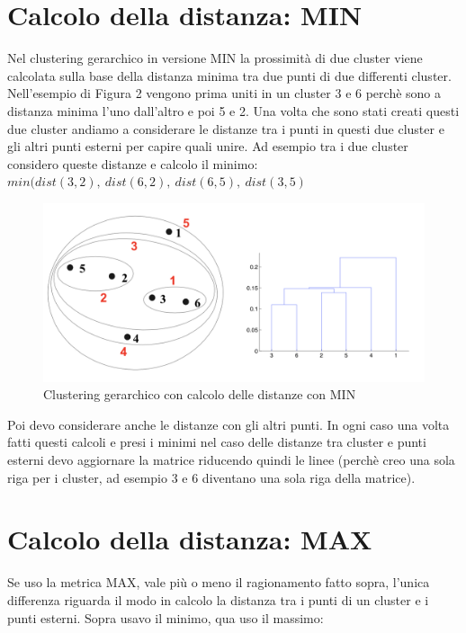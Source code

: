 \documentclass[14pt]{extreport}
\begin{document}
\section{Calcolo della distanza: MIN}

Nel clustering gerarchico in versione MIN la prossimità di due cluster viene calcolata sulla base della distanza minima tra due punti di due differenti cluster.
Nell'esempio di Figura 2 vengono prima uniti in un cluster 3 e 6 perchè sono a distanza minima l'uno dall'altro e poi 5 e 2.
Una volta che sono stati creati questi due cluster andiamo a considerare le distanze tra i punti in questi due cluster e gli altri punti esterni per capire quali unire.
Ad esempio tra i due cluster considero queste distanze e calcolo il minimo:
$min(dist(3,2), \ dist(6,2), \ dist(6,5), \ dist(3,5)$

\begin{figure}[H]
  \centerline\includegraphics[width=\linewidth]{MIN.png}
  \caption{Clustering gerarchico con calcolo delle distanze con MIN}
\end{figure}

Poi devo considerare anche le distanze con gli altri punti. In ogni caso una volta fatti questi calcoli e presi i minimi nel caso delle distanze tra cluster e punti esterni devo aggiornare la matrice riducendo quindi le linee (perchè creo una sola riga per i cluster, ad esempio 3 e 6 diventano una sola riga della matrice).

\section{Calcolo della distanza: MAX}

Se uso la metrica MAX, vale più o meno il ragionamento fatto sopra, l'unica differenza riguarda il modo in calcolo la distanza tra i punti di un cluster e i punti esterni. Sopra usavo il minimo, qua uso il massimo:
\end{document}
